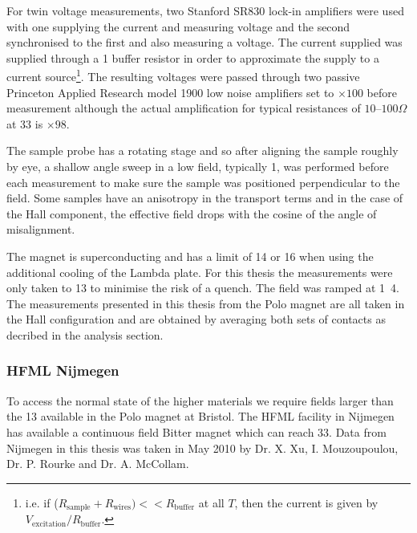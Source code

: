 For twin voltage measurements, two Stanford SR830 lock-in amplifiers were used with one supplying the current and measuring voltage and the second synchronised to the first and also measuring a voltage. The current supplied was supplied through a \unit{1}{\kilo\ohm} buffer resistor in order to approximate the supply to a current source\footnote{i.e. if ($R_{\textrm{sample}} + R_{\textrm{wires}}) << R_{\textrm{buffer}} $ at all $T$, then the current is given by $V_{\textrm{excitation}}/R_{\textrm{buffer}}$.}. The resulting voltages were passed through two passive Princeton Applied Research model 1900 low noise amplifiers set to $\times100$ before measurement although the actual amplification for typical resistances of $10$--$100\Omega$ at \unit{33}{\hertz} is $\times 98$.

The sample probe has a rotating stage and so after aligning the sample roughly by eye, a shallow angle sweep in a low field, typically \unit{1}{\tesla}, was performed before each measurement to make sure the sample was positioned perpendicular to the field. Some samples have an anisotropy in the transport terms and in the case of the Hall component, the effective field drops with the cosine of the angle of misalignment.

The magnet is superconducting and has a limit of \unit{14}{\tesla} or \unit{16}{\tesla} when using the additional cooling of the Lambda plate. For this thesis the measurements were only taken to \unit{13}{\tesla} to minimise the risk of a quench. The field was ramped at \unit{1.4}{\tesla\per\minute}. The measurements presented in this thesis from the Polo magnet are all taken in the Hall configuration and are obtained by averaging both sets of contacts as decribed in the analysis section.


\subsubsection{\ac{HFML} Nijmegen}

To access the normal state of the higher \Tc materials we require fields larger than the \unit{13}{\tesla} available in the Polo magnet at Bristol. The \ac{HFML} facility in Nijmegen has available a continuous field Bitter magnet which can reach \unit{33}{\tesla}. Data from Nijmegen in this thesis was taken in May 2010 by Dr. X. Xu, I. Mouzoupoulou, Dr. P. Rourke and Dr. A. McCollam.

